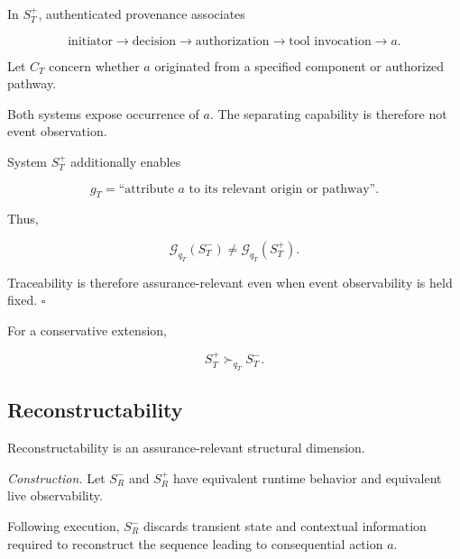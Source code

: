 In \(S_T^{+}\), authenticated provenance associates

\begin{equation}
  \text{initiator}
  \rightarrow
  \text{decision}
  \rightarrow
  \text{authorization}
  \rightarrow
  \text{tool invocation}
  \rightarrow
  a.
\end{equation}

Let \(C_T\) concern whether \(a\) originated from a specified component or authorized pathway.

Both systems expose occurrence of \(a\).
The separating capability is therefore not event observation.

System \(S_T^{+}\) additionally enables

\begin{equation}
  g_T
  =
  \text{``attribute }a\text{ to its relevant origin or pathway''}.
\end{equation}

Thus,

\begin{equation}
  \mathcal{G}_{q_T}(S_T^{-})
  \neq
  \mathcal{G}_{q_T}(S_T^{+}).
\end{equation}

Traceability is therefore assurance-relevant even when event observability is held fixed.
\hfill\(\square\)

For a conservative extension,

\begin{equation}
  S_T^{+}
  \succ_{q_T}
  S_T^{-}.
\end{equation}

\subsection{Reconstructability}
\label{aa.subsec.reconstructability-contribution}

\begin{proposition}
  \label{se320.prop.ReconstructabilityContribution}
  Reconstructability is an assurance-relevant structural dimension.
\end{proposition}

\textit{Construction.}
Let \(S_R^{-}\) and \(S_R^{+}\) have equivalent runtime behavior and equivalent live observability.

Following execution, \(S_R^{-}\) discards transient state and contextual information required to reconstruct the sequence leading to consequential action \(a\).

